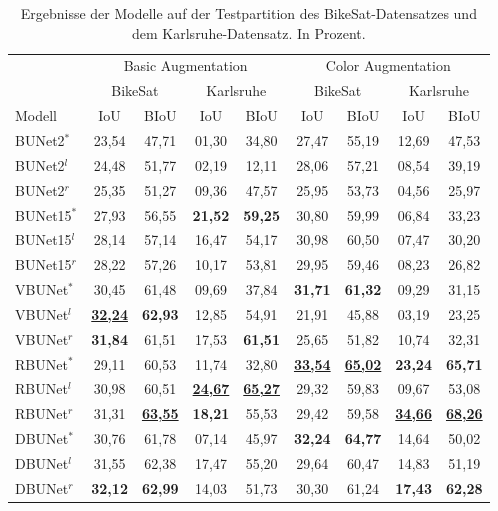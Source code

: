 \begin{table}[ht]
	\centering
	\begin{tabular}{l|cc|cc|cc|cc}
		& \multicolumn{4}{c|}{Basic Augmentation} & \multicolumn{4}{c}{Color Augmentation} \\
        & \multicolumn{2}{c|}{BikeSat} & \multicolumn{2}{c|}{Karlsruhe} & \multicolumn{2}{c|}{BikeSat} & \multicolumn{2}{c}{Karlsruhe} \\
		Modell & \ac{IoU} & \ac{BIoU} & \ac{IoU} & \ac{BIoU} & \ac{IoU} & \ac{BIoU} & \ac{IoU} & \ac{BIoU} \\
		\midrule
        BUNet2$^*$ & 23,54 & 47,71 & 01,30 & 34,80 &  27,47 & 55,19 & 12,69 & 47,53 \\
        BUNet2$^l$ & 24,48 & 51,77 & 02,19 & 12,11 &  28,06 & 57,21 & 08,54 & 39,19 \\
        BUNet2$^r$ & 25,35 & 51,27 & 09,36 & 47,57 &  25,95 & 53,73 & 04,56 & 25,97 \\
		\midrule

        BUNet15$^*$ & 27,93 & 56,55 & \textbf{21,52} & \textbf{59,25} &  30,80 & 59,99 & 06,84 & 33,23 \\
        BUNet15$^l$ & 28,14 & 57,14 & 16,47 & 54,17 &  30,98 & 60,50 & 07,47 & 30,20 \\
        BUNet15$^r$ & 28,22 & 57,26 & 10,17 & 53,81 &  29,95 & 59,46 & 08,23 & 26,82 \\
		\midrule

        VBUNet$^*$ & 30,45 & 61,48 & 09,69 & 37,84 &  \textbf{31,71} & \textbf{61,32} & 09,29 & 31,15 \\
        VBUNet$^l$ & \underline{\textbf{32,24}} & \textbf{62,93} & 12,85 & 54,91 &  21,91 & 45,88 & 03,19 & 23,25 \\
        VBUNet$^r$ & \textbf{31,84} & 61,51 & 17,53 & \textbf{61,51} &  25,65 & 51,82 & 10,74 & 32,31 \\
		\midrule

        RBUNet$^*$ & 29,11 & 60,53 & 11,74 & 32,80 &  \underline{\textbf{33,54}} & \underline{\textbf{65,02}} & \textbf{23,24} & \textbf{65,71} \\
        RBUNet$^l$ & 30,98 & 60,51 & \underline{\textbf{24,67}} & \underline{\textbf{65,27}} &  29,32 & 59,83 & 09,67 & 53,08 \\
        RBUNet$^r$ & 31,31 & \underline{\textbf{63,55}} & \textbf{18,21} & 55,53 &  29,42 & 59,58 & \underline{\textbf{34,66}} & \underline{\textbf{68,26}} \\
		\midrule

        DBUNet$^*$ & 30,76 & 61,78 & 07,14 & 45,97 &  \textbf{32,24} & \textbf{64,77} & 14,64 & 50,02 \\
        DBUNet$^l$ & 31,55 & 62,38 & 17,47 & 55,20 &  29,64 & 60,47 & 14,83 & 51,19 \\
        DBUNet$^r$ & \textbf{32,12} & \textbf{62,99} & 14,03 & 51,73 &  30,30 & 61,24 & \textbf{17,43} & \textbf{62,28} \\
        
	\end{tabular}
	\caption{Ergebnisse der Modelle auf der Testpartition des BikeSat-Datensatzes und dem Karlsruhe-Datensatz. 
    In Prozent.}
	\label{tab:results}
\end{table}

